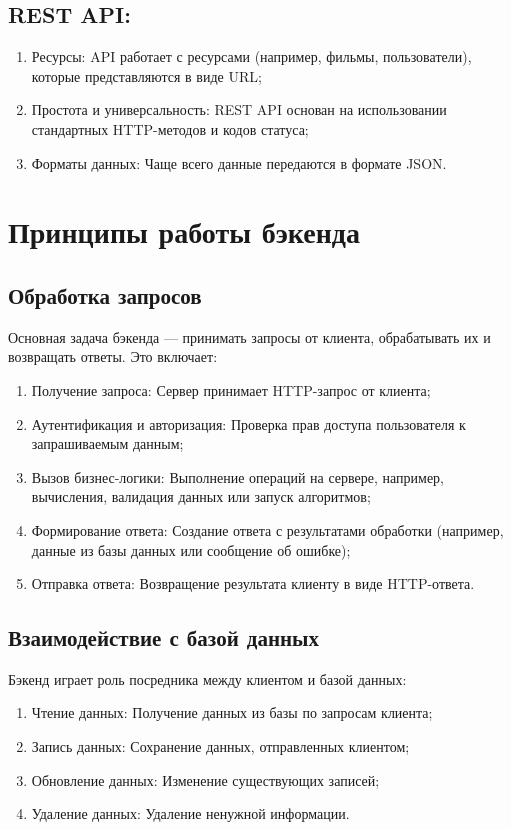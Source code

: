 \subsection*{REST API:}
\begin{enumerate}
    \item Ресурсы: API работает с ресурсами (например, фильмы, пользователи), которые представляются в виде URL;
    \item Простота и универсальность: REST API основан на использовании стандартных HTTP-методов и кодов статуса;
    \item Форматы данных: Чаще всего данные передаются в формате JSON.
\end{enumerate}

\section{Принципы работы бэкенда}
\subsection*{Обработка запросов}
Основная задача бэкенда — принимать запросы от клиента, обрабатывать их и возвращать ответы. Это включает:
\begin{enumerate}
    \item Получение запроса: Сервер принимает HTTP-запрос от клиента;
    \item Аутентификация и авторизация: Проверка прав доступа пользователя к запрашиваемым данным;
    \item Вызов бизнес-логики: Выполнение операций на сервере, например, вычисления, валидация данных или запуск алгоритмов;
    \item Формирование ответа: Создание ответа с результатами обработки (например, данные из базы данных или сообщение об ошибке);
    \item Отправка ответа: Возвращение результата клиенту в виде HTTP-ответа.
\end{enumerate}

\subsection*{Взаимодействие с базой данных}
Бэкенд играет роль посредника между клиентом и базой данных:
\begin{enumerate}
    \item Чтение данных: Получение данных из базы по запросам клиента;
    \item Запись данных: Сохранение данных, отправленных клиентом;
    \item Обновление данных: Изменение существующих записей;
    \item Удаление данных: Удаление ненужной информации.
\end{enumerate}

